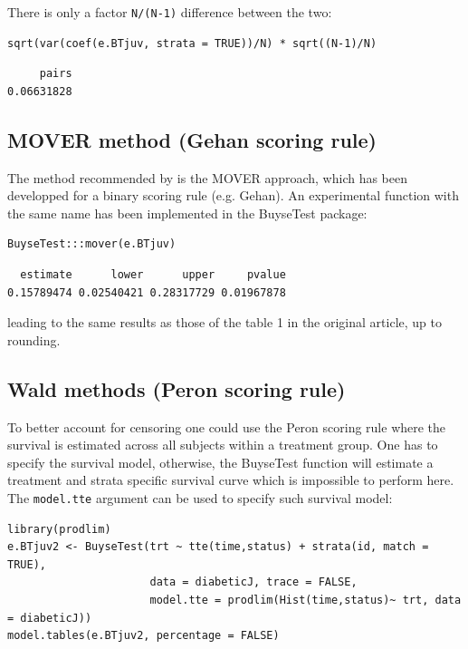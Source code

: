\documentclass[12pt]{article}
\begin{document}
There is only a factor \texttt{N/(N-1)} difference between the two:
\lstset{language=r,label= ,caption= ,captionpos=b,numbers=none}
\begin{lstlisting}
sqrt(var(coef(e.BTjuv, strata = TRUE))/N) * sqrt((N-1)/N)
\end{lstlisting}

\begin{verbatim}
     pairs 
0.06631828
\end{verbatim}

\subsection{MOVER method (Gehan scoring rule)}
\label{sec:org69716c4}

The method recommended by \cite{matsouaka2022robust} is the MOVER
approach, which has been developped for a binary scoring rule
(e.g. Gehan). An experimental function with the same name has been
implemented in the BuyseTest package:

\lstset{language=r,label= ,caption= ,captionpos=b,numbers=none}
\begin{lstlisting}
BuyseTest:::mover(e.BTjuv)
\end{lstlisting}
\begin{verbatim}
  estimate      lower      upper     pvalue 
0.15789474 0.02540421 0.28317729 0.01967878
\end{verbatim}


leading to the same results as those of the table 1 in the original article, up to rounding.

\clearpage

\subsection{Wald methods (Peron scoring rule)}
\label{sec:orgaae0c41}

To better account for censoring one could use the Peron scoring rule
where the survival is estimated across all subjects within a treatment
group. One has to specify the survival model, otherwise, the BuyseTest
function will estimate a treatment and strata specific survival curve
which is impossible to perform here. The \texttt{model.tte} argument can be
used to specify such survival model:
\lstset{language=r,label= ,caption= ,captionpos=b,numbers=none}
\begin{lstlisting}
library(prodlim)
e.BTjuv2 <- BuyseTest(trt ~ tte(time,status) + strata(id, match = TRUE), 
                      data = diabeticJ, trace = FALSE,
                      model.tte = prodlim(Hist(time,status)~ trt, data = diabeticJ))
model.tables(e.BTjuv2, percentage = FALSE)
\end{lstlisting}
\end{document}
